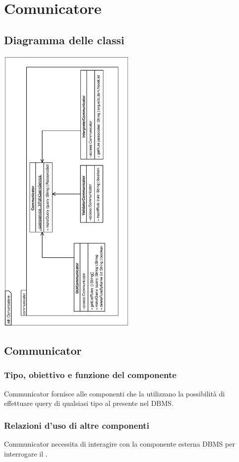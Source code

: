 \documentclass[11pt,titlepage,a4paper]{report}
\begin{document}
\section{Comunicatore}
\subsection{Diagramma delle classi}
\begin{center}
\includegraphics[width=0.5\textwidth, angle=-90]{DiagrammaClassi/Comunicatore.eps}
\end{center}
\subsection{Communicator}
\subsubsection{Tipo, obiettivo e funzione del componente}
Communicator fornisce alle componenti che la utilizzano la possibilit\`a di effettuare query di qualsiasi tipo al \re presente nel DBMS.
\subsubsection{Relazioni d'uso di altre componenti}
Communicator necessita di interagire con la componente esterna DBMS per interrogare il \re.
\end{document}
